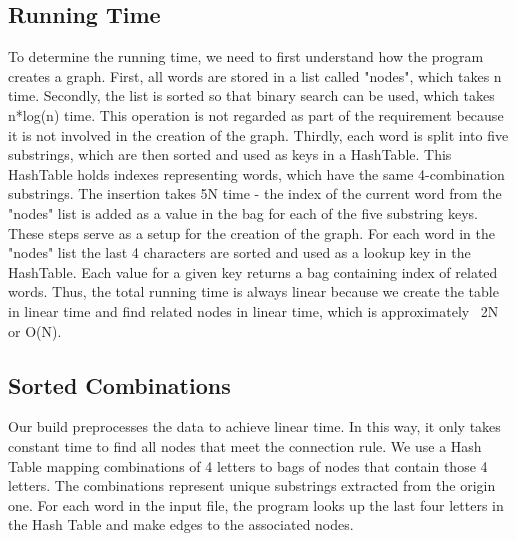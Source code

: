 \documentclass{tufte-handout}
\begin{document}
\subsection{Running Time}
To determine the running time, we need to first understand how the program creates a graph. First, all words are stored in a list called "nodes", which takes n time. Secondly, the list is sorted so that binary search can be used, which takes n*log(n) time. This operation is not regarded as part of the requirement because it is not involved in the creation of the graph. Thirdly, each word is split into five substrings, which are then sorted and used as keys in a HashTable. This HashTable holds indexes representing words, which have the same 4-combination substrings. The insertion takes 5N time - the index of the current word from the "nodes" list is added as a value in the bag for each of the five substring keys. These steps serve as a setup for the creation of the graph. For each word in the "nodes" list the last 4 characters are sorted and used as a lookup key in the HashTable. Each value for a given key returns a bag containing index of related words. 
\linebreak
Thus, the total running time is always linear because we create the table in linear time and find related nodes in linear time, which is approximately ~2N or O(N).

\subsection{Sorted Combinations}
Our build preprocesses the data to achieve linear time. In this way, it only takes constant time to find all nodes that meet the connection rule. We use a Hash Table mapping combinations of 4 letters to bags of nodes that contain those 4 letters. The combinations represent unique substrings extracted from the origin one. For each word in the input file, the program looks up the last four letters in the Hash Table and make edges to the associated nodes.
\end{document}
